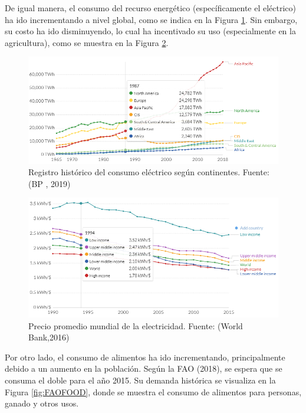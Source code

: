 \documentclass[12pt,a4paper]{article}
\begin{document}
De igual manera, el consumo del recurso energético (específicamente el eléctrico) ha ido incrementando a nivel global, como se indica en la Figura \ref{fig:PRIMEC}. Sin embargo, su costo ha ido disminuyendo, lo cual ha incentivado su uso (especialmente en la agricultura), como se muestra en la Figura \ref{fig:ENEINTEC}.

  		\begin{figure}[H]
  		\centering
    	\includegraphics[width=\linewidth]{imagenes/Primary energy comsumption by worl region(BP Stadistical Review of World Enegy(2019)).PNG}
  		\caption{Registro histórico del consumo eléctrico según continentes. Fuente: (BP , 2019)}
  		\label{fig:PRIMEC}
		\end{figure}%
		
			
		\begin{figure}[H]
  		\centering
   		\includegraphics[width=\linewidth]{imagenes/Energy intensity of economics(World Bank, Sustainable for All).PNG}
  		\caption{Precio promedio mundial de la electricidad. Fuente: (World Bank,2016)}
  		\label{fig:ENEINTEC}
  		\end{figure}

Por otro lado, el consumo de alimentos ha ido incrementando, principalmente debido a un aumento en la población. Según la FAO (2018), se espera que se consuma el doble para el año 2015. Su demanda histórica se visualiza en la Figura \ref{fig:FAOFOOD}, donde se muestra el consumo de alimentos para personas, ganado y otros usos.
\end{document}
